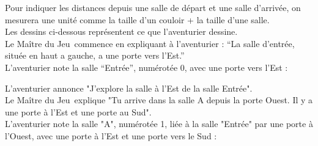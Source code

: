 \documentclass{article}
\newcommand{\mj}{Maître du Jeu}
\begin{document}
        \bigskip

        Pour indiquer les distances depuis une salle de départ et une salle d'arrivée, on mesurera une unité comme la taille d'un couloir + la taille d'une salle.\\

        Les dessins ci-dessous représentent ce que l'aventurier dessine.\\

        Le \mj\ commence en expliquant à l'aventurier : “La salle d’entrée, située en haut a gauche, a une porte vers l’Est.”\\
        L'aventurier note la salle “Entrée”, numérotée 0, avec une porte vers l’Est :\\

        \bigskip

        \bigskip

        L'aventurier annonce "J'explore la salle à l'Est de la salle Entrée".\\
        Le \mj\ explique "Tu arrive dans la salle A depuis la porte Ouest. Il y a une porte à l'Est et une porte au Sud".\\
        L'aventurier note la salle "A", numérotée 1, liée à la salle "Entrée" par une porte à l'Ouest, avec une porte à l'Est et une porte vers le Sud :\\
\end{document}
